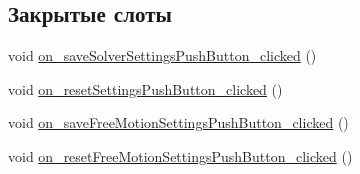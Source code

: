 \subsection*{Закрытые слоты}
\begin{DoxyCompactItemize}
\item 
void \mbox{\hyperlink{class_solver_settings_a0419c649ec7741ee258fce119d392905}{on\+\_\+save\+Solver\+Settings\+Push\+Button\+\_\+clicked}} ()
\item 
void \mbox{\hyperlink{class_solver_settings_aed5d865a1e727b9cf4e2ec81bbaed8ab}{on\+\_\+reset\+Settings\+Push\+Button\+\_\+clicked}} ()
\item 
void \mbox{\hyperlink{class_solver_settings_a20637d6f070d2b382e3d875aba91eccc}{on\+\_\+save\+Free\+Motion\+Settings\+Push\+Button\+\_\+clicked}} ()
\item 
void \mbox{\hyperlink{class_solver_settings_a9d3176e0bf47b4d8ab9969f9e3b359ab}{on\+\_\+reset\+Free\+Motion\+Settings\+Push\+Button\+\_\+clicked}} ()
\end{DoxyCompactItemize}

